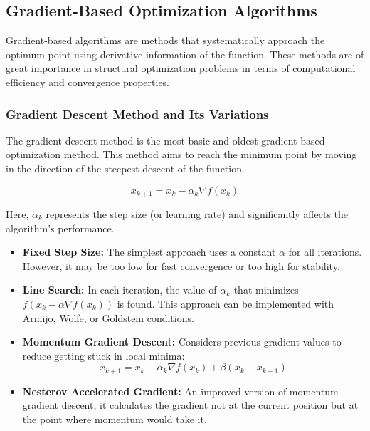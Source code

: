 \subsection{Gradient-Based Optimization Algorithms}

Gradient-based algorithms are methods that systematically approach the optimum point using derivative information of the function. These methods are of great importance in structural optimization problems in terms of computational efficiency and convergence properties.

\subsubsection{Gradient Descent Method and Its Variations}
The gradient descent method is the most basic and oldest gradient-based optimization method. This method aims to reach the minimum point by moving in the direction of the steepest descent of the function.

\begin{equation}
x_{k+1} = x_k - \alpha_k \nabla f(x_k)
\end{equation}

Here, $\alpha_k$ represents the step size (or learning rate) and significantly affects the algorithm's performance.

\begin{tcolorbox}[title=Gradient Descent Variations]
\begin{itemize}
    \item \textbf{Fixed Step Size:} The simplest approach uses a constant $\alpha$ for all iterations. However, it may be too low for fast convergence or too high for stability.
    
    \item \textbf{Line Search:} In each iteration, the value of $\alpha_k$ that minimizes $f(x_k - \alpha \nabla f(x_k))$ is found. This approach can be implemented with Armijo, Wolfe, or Goldstein conditions.
    
    \item \textbf{Momentum Gradient Descent:} Considers previous gradient values to reduce getting stuck in local minima:
    $$x_{k+1} = x_k - \alpha_k \nabla f(x_k) + \beta (x_k - x_{k-1})$$
    
    \item \textbf{Nesterov Accelerated Gradient:} An improved version of momentum gradient descent, it calculates the gradient not at the current position but at the point where momentum would take it.
\end{itemize}
\end{tcolorbox}

